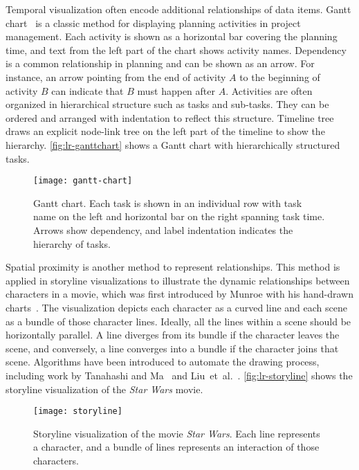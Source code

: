 Temporal visualization often encode additional relationships of data items. Gantt chart~\cite{Gantt1913} is a classic method for displaying planning activities in project management. Each activity is shown as a horizontal bar covering the planning time, and text from the left part of the chart shows activity names. Dependency is a common relationship in planning and can be shown as an arrow. For instance, an arrow pointing from the end of activity $A$ to the beginning of activity $B$ can indicate that $B$ must happen after $A$. Activities are often organized in hierarchical structure such as tasks and sub-tasks. They can be ordered and arranged with indentation to reflect this structure. Timeline tree~\cite{Burch2008} draws an explicit node-link tree on the left part of the timeline to show the hierarchy. \autoref{fig:lr-ganttchart} shows a Gantt chart with hierarchically structured tasks.

\begin{figure}[!htb]
	\centering
	\texttt{[image: gantt-chart]}
	\caption{Gantt chart. Each task is shown in an individual row with task name on the left and horizontal bar on the right spanning task time. Arrows show dependency, and label indentation indicates the hierarchy of tasks. }
	\label{fig:lr-ganttchart}
\end{figure}

Spatial proximity is another method to represent relationships. This method is applied in storyline visualizations to illustrate the dynamic relationships between characters in a movie, which was first introduced by Munroe with his hand-drawn charts~\cite{Munroe2009}. The visualization depicts each character as a curved line and each scene as a bundle of those character lines. Ideally, all the lines within a scene should be horizontally parallel. A line diverges from its bundle if the character leaves the scene, and conversely, a line converges into a bundle if the character joins that scene. Algorithms have been introduced to automate the drawing process, including work by Tanahashi and Ma~\cite{Tanahashi2012} and Liu~et~al.~\cite{Liu2013}. \autoref{fig:lr-storyline} shows the storyline visualization of the \emph{Star Wars} movie.

\begin{figure}[!htb]
	\centering
	\texttt{[image: storyline]}
	\caption{Storyline visualization of the movie \emph{Star Wars}. Each line represents a character, and a bundle of lines represents an interaction of those characters. }
	\label{fig:lr-storyline}
\end{figure}

